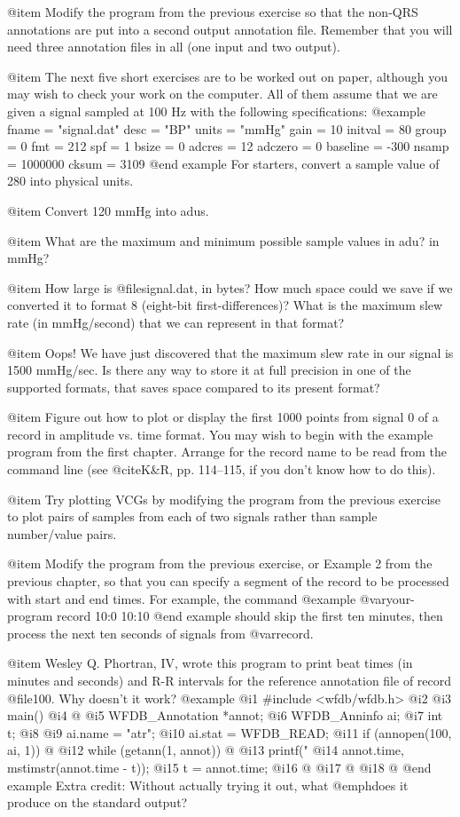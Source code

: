 {{{{{{{{{@item
Modify the program from the previous exercise so that the non-QRS
annotations are put into a second output annotation file.  Remember that
you will need three annotation files in all (one input and two
output).

@item
The next five short exercises are to be worked out on paper, although you
may wish to check your work on the computer.  All of them assume that
we are given a signal sampled at 100 Hz with the following
specifications:
@example
fname = "signal.dat"
desc = "BP"
units = "mmHg"
gain = 10
initval = 80
group = 0
fmt = 212
spf = 1
bsize = 0
adcres = 12
adczero = 0
baseline = -300
nsamp = 1000000
cksum = 3109
@end example
For starters, convert a sample value of 280 into physical units.

@item
Convert 120 mmHg into adus.

@item
What are the maximum and minimum possible sample values in adu?  in
mmHg?

@item
How large is @file{signal.dat}, in bytes?  How much space could we save
if we converted it to format 8 (eight-bit first-differences)?  What is
the maximum slew rate (in mmHg/second) that we can represent in that
format?

@item
Oops!  We have just discovered that the maximum slew rate in our signal
is 1500 mmHg/sec.  Is there any way to store it at full precision in one
of the supported formats, that saves space compared to its present
format?

@item
Figure out how to plot or display the first 1000 points from signal 0 of
a record in amplitude vs. time format.  You may wish to begin with the
example program from the first chapter.  Arrange for the record name to
be read from the command line (see @cite{K&R}, pp. 114--115, if you
don't know how to do this).

@item
Try plotting VCGs by modifying the program from the previous exercise to
plot pairs of samples from each of two signals rather than sample
number/value pairs.

@item
Modify the program from the previous exercise, or Example 2 from the
previous chapter, so that you can specify a segment of the record to be
processed with start and end times.  For example, the command
@example
@var{your-program record} 10:0 10:10
@end example
should skip the first ten minutes, then process the next ten seconds of
signals from @var{record}.

@item
Wesley Q. Phortran, IV, wrote this program to print beat times (in
minutes and seconds) and R-R intervals for the reference annotation file
of record @file{100}.  Why doesn't it work?
@example
 @i{1}  #include <wfdb/wfdb.h>
 @i{2}
 @i{3}  main()
 @i{4}  @{
 @i{5}      WFDB_Annotation *annot;
 @i{6}      WFDB_Anninfo ai;
 @i{7}      int t;
 @i{8}
 @i{9}      ai.name = "atr";
@i{10}      ai.stat = WFDB_READ;
@i{11}      if (annopen(100, ai, 1)) @{
@i{12}          while (getann(1, annot)) @{
@i{13}              printf("%
@i{14}                     annot.time, mstimstr(annot.time - t));
@i{15}              t = annot.time;
@i{16}          @}
@i{17}      @}
@i{18}  @}
@end example
Extra credit: Without actually trying it out, what @emph{does} it
produce on the standard output?

}}}}}}}}}
